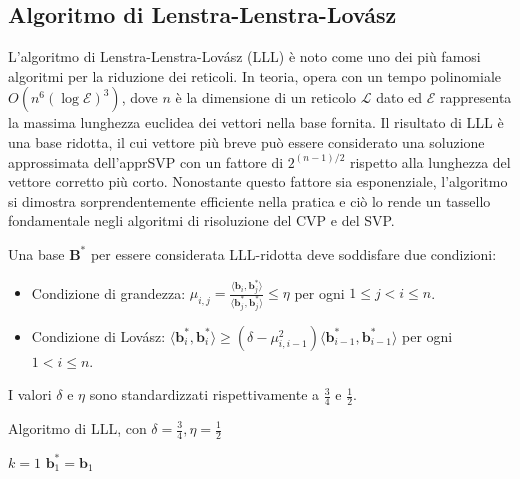\subsection{Algoritmo di Lenstra-Lenstra-Lovász}
L'algoritmo di Lenstra-Lenstra-Lovász (LLL)\cite{LLL82,HDMRD08} è noto come uno dei più famosi algoritmi per 
la riduzione dei reticoli. 
In teoria, opera con un tempo polinomiale $O(n^6 (\log\mathcal{E})^3)$, dove $n$ è la dimensione di un 
reticolo $\mathcal{L}$ dato ed $\mathcal{E}$ rappresenta la massima lunghezza euclidea dei vettori nella base 
fornita. Il risultato di LLL è una base ridotta, il cui vettore più breve può essere 
considerato una soluzione approssimata dell'apprSVP con un fattore di $2^{(n-1)/2}$ rispetto 
alla lunghezza del vettore corretto più corto. Nonostante questo fattore sia 
esponenziale, l'algoritmo si dimostra sorprendentemente efficiente nella pratica e ciò lo rende
un tassello fondamentale negli algoritmi di risoluzione del CVP e del SVP. 

Una base $\mathbf{B}^*$ per essere considerata LLL-ridotta deve soddisfare due condizioni:
\begin{itemize}
    \item Condizione di grandezza: $\mu_{i,j} = \frac{\langle \mathbf{b}_i,\mathbf{b}_j^* \rangle}
    {\langle \mathbf{b}_j^*,\mathbf{b}_j^* \rangle}  
    \leq \eta$ per ogni $1\leq j < i \leq n$.
    \item Condizione di Lovász: $\langle \mathbf{b}_i^*,\mathbf{b}_i^* \rangle \geq 
    (\delta- \mu^2_{i,i-1}) \langle \mathbf{b}_{i-1}^*,\mathbf{b}_{i-1}^* \rangle$
    per ogni $1 < i \leq n$.
\end{itemize}
I valori $\delta$ e $\eta$ sono standardizzati rispettivamente a $\frac{3}{4}$ e $\frac{1}{2}$.

\begin{algorithm}
    \caption{Algoritmo di LLL, con $\delta = \frac{3}{4}, \eta=\frac{1}{2}$}
    \label{alg:two}
    \DontPrintSemicolon
    $k=1$\;
    $\mathbf{b}_1^* = \mathbf{b}_1$\;

\end{algorithm}

